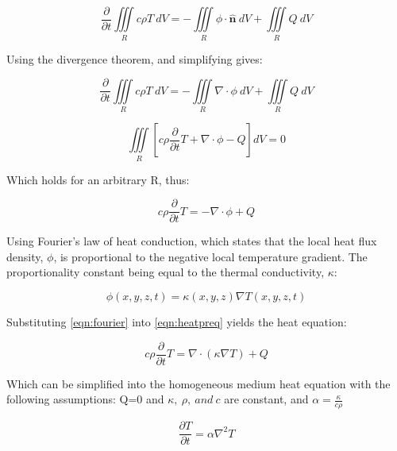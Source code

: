 \begin{appendices}
\begin{equation}
\frac{\partial}{\partial t} \iiint\limits_{R} c\rho T\ dV = -\iiint \limits_{R} \phi\cdot \mathbf{\hat{n}}\ dV +  \iiint\limits_{R} Q\ dV
\end{equation}

Using the divergence theorem, and simplifying gives: 


\begin{equation}
\frac{\partial}{\partial t} \iiint\limits_{R} c\rho T\ dV = -\iiint \limits_{R} \nabla\cdot \phi\ dV +  \iiint\limits_{R} Q\ dV
\end{equation}

\begin{equation}
\iiint\limits_{R} \left[ c\rho \frac{\partial}{\partial t} T + \nabla\cdot \phi - Q\right] dV = 0
\end{equation}

Which holds for an arbitrary R, thus:

\begin{equation}
c\rho\frac{\partial}{\partial t}T = - \nabla \cdot \phi + Q
\label{eqn:heatpreq}
\end{equation}



Using Fourier's law of heat conduction, which states that the local heat flux density, $\phi$, is proportional to the negative local temperature gradient. The proportionality constant being equal to the thermal conductivity, $\kappa$:

\begin{equation}
\phi(x,y,z,t)=\kappa(x,y,z)\nabla T(x,y,z,t)
\label{eqn:fourier}
\end{equation}

Substituting \cref{eqn:fourier} into \cref{eqn:heatpreq} yields the heat equation:

\begin{equation}
c\rho\frac{\partial}{\partial t}T = \nabla\cdot (\kappa\nabla T) + Q
\end{equation}

Which can be simplified into the homogeneous medium heat equation with the following assumptions: Q=0 and $\kappa,\ \rho,\ and\ c$ are constant, and $\alpha=\tfrac{\kappa}{c\rho}$

\begin{equation}
\frac{\partial T}{\partial t} = \alpha \nabla^2 T
\end{equation}


\end{appendices}
